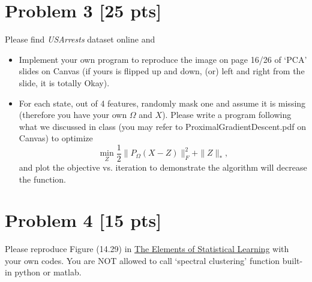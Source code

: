 \documentclass[11pt]{article}
\begin{document}
\section*{Problem 3 [25 pts]}
Please find \textit{USArrests} dataset online and 
\begin{itemize}
	\item Implement your own program to reproduce the image on page 16/26 of `PCA' slides on Canvas (if yours is flipped up and down, (or) left and right from the slide, it is totally Okay).
	\item For each state, out of 4 features, randomly mask one and assume it is missing (therefore you have your own $\Omega$ and $X$). Please write a program following what we discussed in class (you may refer to ProximalGradientDescent.pdf on Canvas) to optimize  
		\begin{equation}
		\min_{Z} \frac{1}{2}\|P_\Omega(X-Z)\|_F^2+\|Z\|_*,
	\end{equation}
	and plot the objective vs. iteration to demonstrate the algorithm will decrease the function.
\end{itemize}


\newpage

\section*{Problem 4 [15 pts]}
Please reproduce Figure (14.29) in \href{https://hastie.su.domains/ElemStatLearn/}{The Elements of
	Statistical Learning} with your own codes. You are NOT allowed to call `spectral clustering' function built-in python or matlab. 
\newpage
\end{document}
